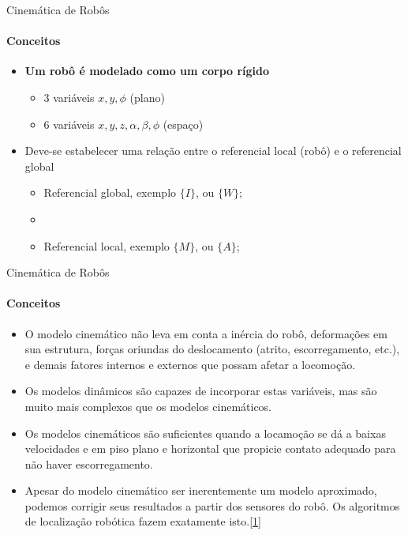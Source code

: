 \documentclass{beamer}
\begin{document}
\begin{frame}{Cinemática de Robôs}
    \framesubtitle{Conceitos}
    \begin{itemize}
        \item \textbf{Um robô é modelado como um corpo rígido}
        \begin{itemize}
            \item 3 variáveis $x, y,\phi$ (plano)
            \item 6 variáveis $x,y,z, \alpha, \beta, \phi$ (espaço)
        \end{itemize}
        \item Deve-se estabelecer uma relação entre o referencial local (robô) e o referencial global
        \begin{itemize}
            \item Referencial global, exemplo $\{I\}$, ou $\{W\}$;
            \item \item Referencial local, exemplo $\{M\}$, ou $\{A\}$;
        \end{itemize}         
    \end{itemize}
\end{frame}


\begin{frame}{Cinemática de Robôs}
    \framesubtitle{Conceitos}
    \begin{itemize}
        \item O modelo cinemático não leva em conta a inércia do robô, deformações em
        sua estrutura, forças oriundas do deslocamento (atrito, escorregamento, etc.),
        e demais fatores internos e externos que possam afetar a locomoção.
        \item Os modelos dinâmicos são capazes de incorporar estas variáveis, mas são
        muito mais complexos que os modelos cinemáticos.
        \item Os modelos cinemáticos são suficientes quando a locamoção se dá a baixas
        velocidades e em piso plano e horizontal que propicie contato adequado para
        não haver escorregamento.
        \item Apesar do modelo cinemático ser inerentemente um modelo aproximado,
        podemos corrigir seus resultados a partir dos sensores do robô. Os algoritmos
        de localização robótica fazem exatamente isto.\href{http://143.106.148.168:9080/Cursos/IA368N/01-16/cinematica2.pdf}{[1]}
    \end{itemize}
\end{frame}
\end{document}
